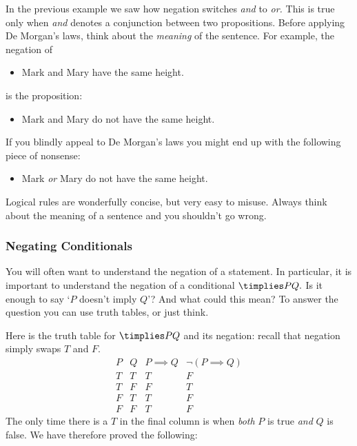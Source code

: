 \begin{aside}

In the previous example we saw how negation switches \emph{and} to \emph{or.} This is true only when \emph{and} denotes a conjunction between two propositions. Before applying De Morgan's laws, think about the \emph{meaning} of the sentence. For example, the negation of
\begin{itemize}\setlength{\itemsep}{0pt}
  \item[] Mark and Mary have the same height.
\end{itemize}
is the proposition:
\begin{itemize}\setlength{\itemsep}{0pt}
  \item[] Mark and Mary do not have the same height.
\end{itemize}
If you blindly appeal to De Morgan's laws you might end up with the following piece of nonsense:
\begin{itemize}\setlength{\itemsep}{0pt}
  \item[] Mark \emph{or} Mary do not have the same height.
\end{itemize}
Logical rules are wonderfully concise, but very easy to misuse. Always think about the meaning of a sentence and you shouldn't go wrong.
\end{aside}
 
\subsubsection*{Negating Conditionals}

You will often want to understand the negation of a statement. In particular, it is important to understand the negation of a conditional $\timplies P{Q.}$ Is it enough to say `$P$ doesn't imply $Q$'? And what could this mean? To answer the question you can use truth tables, or just think.

\noindent Here is the truth table for $\timplies PQ$ and its negation: recall that negation simply swaps $T$ and $F$.
\[\begin{array}{cc|c|c}
P & Q & P\implies Q & \neg(P\implies Q)\\\hline
T & T & T & F\\
T & F & F & T\\
F & T & T & F\\
F & F & T & F
\end{array}\]
The only time there is a $T$ in the final column is when \emph{both} $P$ is true \emph{and} $Q$ is false. We have therefore proved the following:

